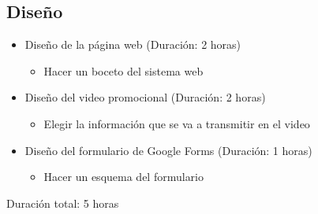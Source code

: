\documentclass{report}
\begin{document}
            \subsection{Diseño}
                \begin{itemize}
                    \item Diseño de la página web (Duración: 2 horas)
                    \begin{itemize}
                        \item Hacer un boceto del sistema web
                    \end{itemize}
                    \item Diseño del video promocional (Duración: 2 horas)
                    \begin{itemize}
                        \item Elegir la información que se va a transmitir en el video
                    \end{itemize}
                    \item Diseño del formulario de Google Forms (Duración: 1 horas)
                    \begin{itemize}
                        \item Hacer un esquema del formulario
                    \end{itemize}
                \end{itemize}
                Duración total: 5 horas
\end{document}
